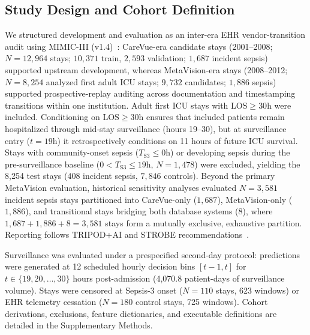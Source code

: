 \documentclass[12pt,a4paper]{article}
\begin{document}
\subsection{Study Design and Cohort Definition}
We structured development and evaluation as an inter-era EHR vendor-transition audit using MIMIC-III (v1.4)~\cite{johnson2016mimiciii}: CareVue-era candidate stays (2001--2008; $N=12,964$ stays; $10,371$ train, $2,593$ validation; $1,687$ incident sepsis) supported upstream development, whereas MetaVision-era stays (2008--2012; $N=8,254$ analyzed first adult ICU stays; $9,732$ candidates; $1,886$ sepsis) supported prospective-replay auditing across documentation and timestamping transitions within one institution. Adult first ICU stays with $\text{LOS} \ge 30\text{h}$ were included. Conditioning on $\text{LOS} \ge 30\text{h}$ ensures that included patients remain hospitalized through mid-stay surveillance (hours 19--30), but at surveillance entry ($t=19\text{h}$) it retrospectively conditions on 11 hours of future ICU survival. Stays with community-onset sepsis ($T_{\text{S3}} \le 0\text{h}$) or developing sepsis during the pre-surveillance baseline ($0 < T_{\text{S3}} \le 19\text{h}$, $N=1,478$) were excluded, yielding the 8,254 test stays ($408$ incident sepsis, $7,846$ controls). Beyond the primary MetaVision evaluation, historical sensitivity analyses evaluated $N=3,581$ incident sepsis stays partitioned into CareVue-only ($1,687$), MetaVision-only ($1,886$), and transitional stays bridging both database systems ($8$), where $1,687 + 1,886 + 8 = 3,581$ stays form a mutually exclusive, exhaustive partition. Reporting follows TRIPOD+AI and STROBE recommendations~\cite{collins2024tripod,vonelm2007strobe}.

Surveillance was evaluated under a prespecified second-day protocol: predictions were generated at 12 scheduled hourly decision bins $[t-1, t]$ for $t \in \{19, 20, \dots, 30\}$ hours post-admission (4,070.8 patient-days of surveillance volume). Stays were censored at Sepsis-3 onset ($N=110$ stays, 623 windows) or EHR telemetry cessation ($N=180$ control stays, 725 windows). Cohort derivations, exclusions, feature dictionaries, and executable definitions are detailed in the Supplementary Methods.
\end{document}
